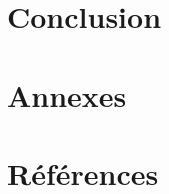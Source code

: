 \documentclass[a4paper, 12pt]{article}
\begin{document}
\section{Conclusion}

\section{Annexes}

\section{Références}


\end{document}
